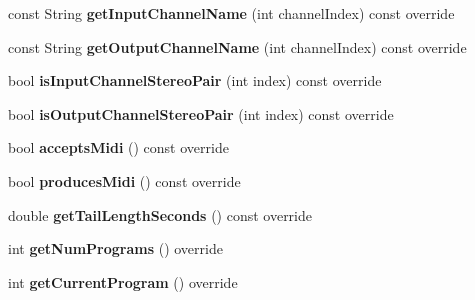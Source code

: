 \begin{DoxyCompactItemize}
\item 
const String {\bfseries get\+Input\+Channel\+Name} (int channel\+Index) const  override\hypertarget{class_synth_audio_processor_a55e9b11a7262393942916f69fbef3a71}{}\label{class_synth_audio_processor_a55e9b11a7262393942916f69fbef3a71}

\item 
const String {\bfseries get\+Output\+Channel\+Name} (int channel\+Index) const  override\hypertarget{class_synth_audio_processor_aaa55e54edaabb47a521a450866b73af9}{}\label{class_synth_audio_processor_aaa55e54edaabb47a521a450866b73af9}

\item 
bool {\bfseries is\+Input\+Channel\+Stereo\+Pair} (int index) const  override\hypertarget{class_synth_audio_processor_a5a939c6ecaf0a7445924944b1771be7c}{}\label{class_synth_audio_processor_a5a939c6ecaf0a7445924944b1771be7c}

\item 
bool {\bfseries is\+Output\+Channel\+Stereo\+Pair} (int index) const  override\hypertarget{class_synth_audio_processor_a3cf46390668fd28f6ee1d17a33bc7a12}{}\label{class_synth_audio_processor_a3cf46390668fd28f6ee1d17a33bc7a12}

\item 
bool {\bfseries accepts\+Midi} () const  override\hypertarget{class_synth_audio_processor_a2b9007a7728cc7c12d187a88c4b054cf}{}\label{class_synth_audio_processor_a2b9007a7728cc7c12d187a88c4b054cf}

\item 
bool {\bfseries produces\+Midi} () const  override\hypertarget{class_synth_audio_processor_a2af30afe3160794a8a9068d0f67430cc}{}\label{class_synth_audio_processor_a2af30afe3160794a8a9068d0f67430cc}

\item 
double {\bfseries get\+Tail\+Length\+Seconds} () const  override\hypertarget{class_synth_audio_processor_a1954cf374ed54eafe345da609f3832b2}{}\label{class_synth_audio_processor_a1954cf374ed54eafe345da609f3832b2}

\item 
int {\bfseries get\+Num\+Programs} () override\hypertarget{class_synth_audio_processor_a8e1111c20928711a64342bf5984c71ac}{}\label{class_synth_audio_processor_a8e1111c20928711a64342bf5984c71ac}

\item 
int {\bfseries get\+Current\+Program} () override\hypertarget{class_synth_audio_processor_ad3a9bfa2a558b698def5b12bd7e55585}{}\label{class_synth_audio_processor_ad3a9bfa2a558b698def5b12bd7e55585}


\end{DoxyCompactItemize}
